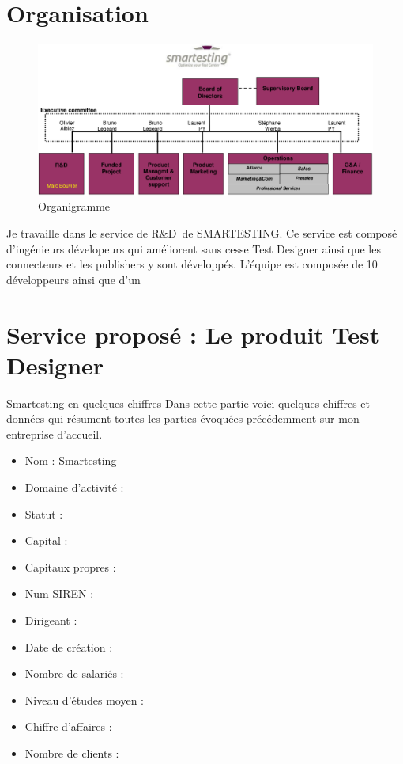 \documentclass[12pt,oneside]{book}
\begin{document}
\pagebreak 
\section{Organisation}

\begin{figure}[!h]
\centering
\includegraphics[scale=0.50]{Illustrations/Organigramme_with_me.png}
\caption{Organigramme}
\label{fig:Organigramme de Smartesting}
\end{figure}
Je travaille dans le service de R\&D{}\ de SMARTESTING. Ce service est composé d'ingénieurs dévelopeurs qui améliorent sans cesse Test Designer ainsi que les connecteurs et les publishers y sont développés. L'équipe est composée de 10 développeurs ainsi que d'un

\section{Service proposé : Le produit Test Designer}
Smartesting en quelques chiffres
Dans cette partie voici quelques chiffres et données qui résument toutes les parties évoquées précédemment sur mon entreprise d'accueil.
\begin{itemize}
\item{Nom : Smartesting} 
\item{Domaine d'activité :} 
\item{Statut :} 
\item{Capital :} 
\item{Capitaux propres :} 
\item{Num SIREN :} 
\item{Dirigeant :} 
\item{Date de création : } 
\item{Nombre de salariés :} 
\item{Niveau d'études moyen :} 
\item{Chiffre d'affaires :} 
\item{Nombre de clients :} 
\end{itemize}
\end{document}
